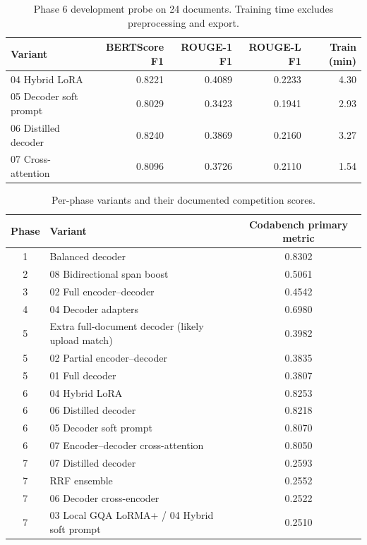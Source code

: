 \documentclass[11pt, oneside]{article}
\begin{document}
\begin{table}[H]
\centering\small
\caption{Phase 6 development probe on 24 documents. Training time excludes preprocessing and export.}
\label{tab:phase6probe}
\begin{tabular}{@{}lrrrr@{}}
\toprule
Variant & BERTScore F1 & ROUGE-1 F1 & ROUGE-L F1 & Train (min) \\
\midrule
04 Hybrid LoRA & 0.8221 & 0.4089 & 0.2233 & 4.30 \\
05 Decoder soft prompt & 0.8029 & 0.3423 & 0.1941 & 2.93 \\
06 Distilled decoder & 0.8240 & 0.3869 & 0.2160 & 3.27 \\
07 Cross-attention & 0.8096 & 0.3726 & 0.2110 & 1.54 \\
\bottomrule
\end{tabular}
\end{table}

\begin{table}[H]
\centering\small
\caption{Per-phase variants and their documented competition scores.}
\label{tab:variants}
\begin{tabular}{@{}clc@{}}
\toprule
Phase & Variant & Codabench primary metric \\
\midrule
1 & Balanced decoder & 0.8302 \\
2 & 08 Bidirectional span boost & 0.5061 \\
3 & 02 Full encoder--decoder & 0.4542 \\
4 & 04 Decoder adapters & 0.6980 \\
5 & Extra full-document decoder (likely upload match) & 0.3982 \\
5 & 02 Partial encoder--decoder & 0.3835 \\
5 & 01 Full decoder & 0.3807 \\
6 & 04 Hybrid LoRA & 0.8253 \\
6 & 06 Distilled decoder & 0.8218 \\
6 & 05 Decoder soft prompt & 0.8070 \\
6 & 07 Encoder--decoder cross-attention & 0.8050 \\
7 & 07 Distilled decoder & 0.2593 \\
7 & RRF ensemble & 0.2552 \\
7 & 06 Decoder cross-encoder & 0.2522 \\
7 & 03 Local GQA LoRMA+ / 04 Hybrid soft prompt & 0.2510 \\
\bottomrule
\end{tabular}
\end{table}
\end{document}
